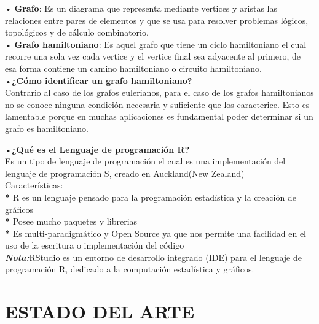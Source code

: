 \documentclass[journal]{IEEEtran}
\begin{document}
• \textbf{Grafo}: Es un diagrama que representa mediante vertices y aristas las relaciones entre pares de elementos y que se usa para resolver problemas l{\'o}gicos, topol{\'o}gicos y de c{\'a}lculo combinatorio.\\

\vspace{0.2mm}
• \textbf{Grafo hamiltoniano}: Es aquel grafo que tiene un ciclo hamiltoniano el cual recorre una sola vez cada vertice y el vertice final sea adyacente al primero, de esa forma contiene un camino hamiltoniano o circuito hamiltoniano.\\


•\textbf{¿{C{\'o}mo identificar un grafo hamiltoniano}?}\\
Contrario al caso de los grafos eulerianos, para el caso de los grafos hamiltonianos no se conoce ninguna condici{\'o}n necesaria y suficiente que los caracterice. Esto es lamentable porque en muchas aplicaciones es fundamental poder determinar si un grafo es hamiltoniano.\\
\vspace{1cm}

•\textbf{¿{Qu{\'e} es el Lenguaje de programaci{\'o}n R}?}\\

Es un tipo de lenguaje de programaci{\'o}n el cual es una implementaci{\'o}n del lenguaje de programaci{\'o}n S, creado en Auckland(New Zealand)\\

Caracter{\'i}sticas:\\
\textbf{*} R es un lenguaje pensado para la programaci{\'o}n estad{\'i}stica y la creaci{\'o}n de gr{\'a}ficos\\
\textbf{*} Posee mucho paquetes y librerias\\
\textbf{*} Es multi-paradigm{\'a}tico y Open Source ya que nos permite una facilidad en el uso de la escritura o implementaci{\'o}n del c{\'o}digo\\
\textit{\textbf{Nota:}}RStudio es un entorno de desarrollo integrado (IDE) para el lenguaje de programación R, dedicado a la computación estadística y gráficos.\\


 
\section{\large\bf ESTADO DEL ARTE}
\end{document}
